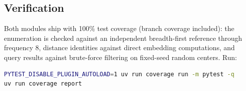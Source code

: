 \documentclass[
  10pt,
]{article}
\begin{document}
\subsection{Verification}\label{verification}

Both modules ship with 100\% test coverage (branch coverage included):
the enumeration is checked against an independent breadth-first
reference through frequency 8, distance identities against direct
embedding computations, and query results against brute-force filtering
on fixed-seed random centers. Run:

\begin{lstlisting}[language=bash]
PYTEST_DISABLE_PLUGIN_AUTOLOAD=1 uv run coverage run -m pytest -q
uv run coverage report
\end{lstlisting}
\end{document}
